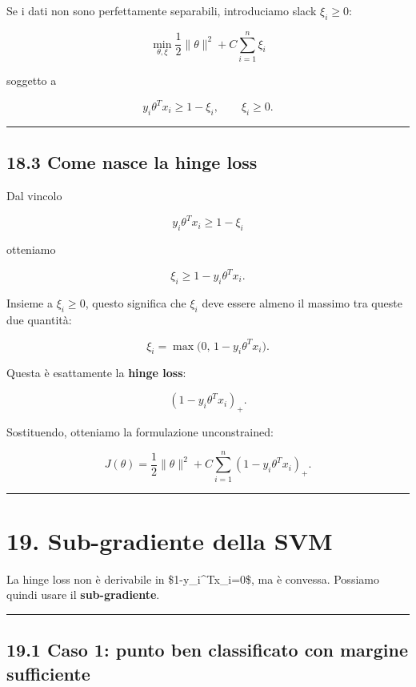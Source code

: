 \documentclass[
]{article}
\begin{document}
Se i dati non sono perfettamente separabili, introduciamo slack
\(\xi_i\ge 0\):

\[
\min_{\theta,\xi}
\frac{1}{2}\|\theta\|^2 + C\sum_{i=1}^n \xi_i
\]

soggetto a

\[
y_i\theta^Tx_i \ge 1-\xi_i,
\qquad
\xi_i\ge 0.
\]

\begin{center}\rule{0.5\linewidth}{0.5pt}\end{center}

\subsection{18.3 Come nasce la hinge
loss}\label{come-nasce-la-hinge-loss}

Dal vincolo

\[
y_i\theta^Tx_i \ge 1-\xi_i
\]

otteniamo

\[
\xi_i \ge 1-y_i\theta^Tx_i.
\]

Insieme a \(\xi_i\ge 0\), questo significa che \(\xi_i\) deve essere
almeno il massimo tra queste due quantità:

\[
\xi_i = \max\big(0,\,1-y_i\theta^Tx_i\big).
\]

Questa è esattamente la \textbf{hinge loss}:

\[
(1-y_i\theta^Tx_i)_+.
\]

Sostituendo, otteniamo la formulazione unconstrained:

\[
J(\theta)=\frac{1}{2}\|\theta\|^2 + C\sum_{i=1}^n (1-y_i\theta^Tx_i)_+.
\]

\begin{center}\rule{0.5\linewidth}{0.5pt}\end{center}

\section{19. Sub-gradiente della SVM}\label{sub-gradiente-della-svm}

La hinge loss non è derivabile in \$1-y\_i\theta\^{}Tx\_i=0\$, ma è
convessa. Possiamo quindi usare il \textbf{sub-gradiente}.

\begin{center}\rule{0.5\linewidth}{0.5pt}\end{center}

\subsection{19.1 Caso 1: punto ben classificato con margine
sufficiente}\label{caso-1-punto-ben-classificato-con-margine-sufficiente}
\end{document}
